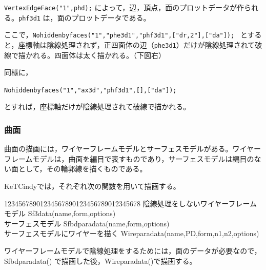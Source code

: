 \documentclass[papersize,a4paper,12pt,uplatex]{jsarticle}
\begin{document}
\begin{description}
\verb|VertexEdgeFace("1",phd);| によって，辺，頂点，面のプロットデータが作られる。\verb|phf3d1| は，面のプロットデータである。

ここで，\verb|Nohiddenbyfaces("1","phe3d1","phf3d1",["dr,2"],["da"]); | とすると，座標軸は陰線処理されず，正四面体の辺（\verb|phe3d1|）だけが陰線処理されて破線で描かれる。四面体は太く描かれる。（下図右）

\vspace{\baselineskip}
\begin{center}  \end{center}
同様に，

\verb|Nohiddenbyfaces("1","ax3d","phf3d1",[],["da"]);|

とすれば，座標軸だけが陰線処理されて破線で描かれる。


\end{description}

\subsubsection{曲面}

曲面の描画には，ワイヤーフレームモデルとサーフェスモデルがある。ワイヤーフレームモデルは，曲面を編目で表すものであり，サーフェスモデルは編目のない面として，その輪郭線を描くものである。
 
 \begin{center}  \end{center}
 

KeTCindyでは，それぞれ次の関数を用いて描画する。
\begin{tabbing}
12345678901234567890123456789012345678\=\kill
陰線処理をしないワイヤーフレームモデル \>Sf3data(name,form,options)\\
サーフェスモデル \>Sfbdparadata(name,form,options)\\
サーフェスモデルにワイヤーを描く \>Wireparadata(name,PD,form,n1,n2,options)
\end{tabbing}
ワイヤーフレームモデルで陰線処理をするためには，面のデータが必要なので，Sfbdparadata() で描画した後，Wireparadata()で描画する。
\end{document}
